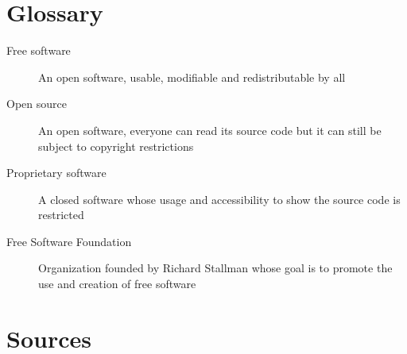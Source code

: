 \documentclass[12pt]{article}
\begin{document}
\section*{Glossary}

\begin{description}
  \item[Free software]{An open software, usable, modifiable and
    redistributable by all}
  \item[Open source]{An open software, everyone can read its source
    code but it can still be subject to copyright restrictions}
  \item[Proprietary software]{A closed software whose usage and
    accessibility to show the source code is restricted}
  \item[Free Software Foundation]{Organization founded by Richard
    Stallman whose goal is to promote the use and creation of free
    software}
\end{description}

\section*{Sources}



\end{document}
